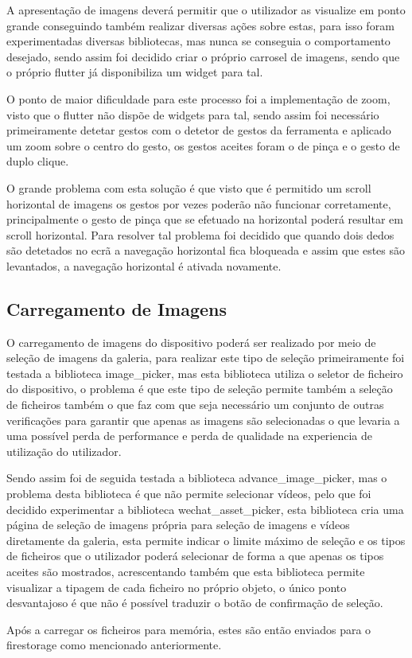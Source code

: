 A apresentação de imagens deverá permitir que o utilizador as visualize em ponto grande conseguindo também realizar diversas ações sobre estas, para isso foram experimentadas diversas bibliotecas, mas nunca se conseguia o comportamento desejado, sendo assim foi decidido criar o próprio carrosel de imagens, sendo que o próprio flutter já disponibiliza um widget para tal.

O ponto de maior dificuldade para este processo foi a implementação de zoom, visto que o flutter não dispõe de widgets para tal, sendo assim foi necessário primeiramente detetar gestos com o detetor de gestos da ferramenta e aplicado um zoom sobre o centro do gesto, os gestos aceites foram o de pinça e o gesto de duplo clique.

O grande problema com esta solução é que visto que é permitido um scroll horizontal de imagens os gestos por vezes poderão não funcionar corretamente, principalmente o gesto de pinça que se efetuado na horizontal poderá resultar em scroll horizontal. Para resolver tal problema foi decidido que quando dois dedos são detetados no ecrã a navegação horizontal fica bloqueada e assim que estes são levantados, a navegação horizontal é ativada novamente.

\newpage

\subsection{Carregamento de Imagens}

O carregamento de imagens do dispositivo poderá ser realizado por meio de seleção de imagens da galeria, para realizar este tipo de seleção primeiramente foi testada a biblioteca image\_picker, mas esta biblioteca utiliza o seletor de ficheiro do dispositivo, o problema é que este tipo de seleção permite também a seleção de ficheiros também o que faz com que seja necessário um conjunto de outras verificações para garantir que apenas as imagens são selecionadas o que levaria a uma possível perda de performance e perda de qualidade na experiencia de utilização do utilizador.

Sendo assim foi de seguida testada a biblioteca advance\_image\_picker, mas o problema desta biblioteca é que não permite selecionar vídeos, pelo que foi decidido experimentar a biblioteca wechat\_asset\_picker, esta biblioteca cria uma página de seleção de imagens própria para seleção de imagens e vídeos diretamente da galeria, esta permite indicar o limite máximo de seleção e os tipos de ficheiros que o utilizador poderá selecionar de forma a que apenas os tipos aceites são mostrados, acrescentando também que esta biblioteca permite visualizar a tipagem de cada ficheiro no próprio objeto, o único ponto desvantajoso é que não é possível traduzir o botão de confirmação de seleção.

Após a carregar os ficheiros para memória, estes são então enviados para o firestorage como mencionado anteriormente.